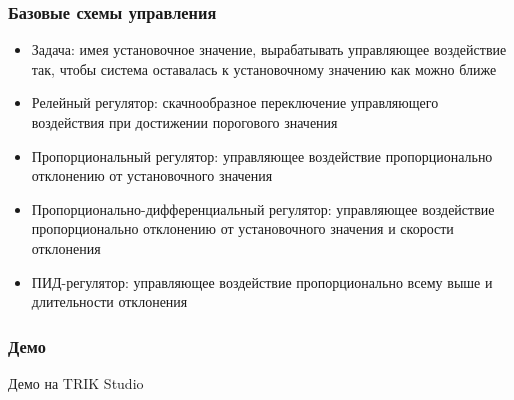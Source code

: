 \documentclass{../../slides-style}
\begin{document}
    \begin{frame}
        \frametitle{Базовые схемы управления}
        \begin{itemize}
            \item Задача: имея установочное значение, вырабатывать управляющее воздействие так, чтобы система оставалась к установочному значению как можно ближе
            \item Релейный регулятор: скачнообразное переключение управляющего воздействия при достижении порогового значения
            \item Пропорциональный регулятор: управляющее воздействие пропорционально отклонению от установочного значения
            \item Пропорционально-дифференциальный регулятор: управляющее воздействие пропорционально отклонению от установочного значения и скорости отклонения
            \item ПИД-регулятор: управляющее воздействие пропорционально всему выше и длительности отклонения
        \end{itemize}
    \end{frame}

    \begin{frame}
        \frametitle{Демо}
        \begin{center}
            \Huge{Демо на TRIK Studio}
        \end{center}
    \end{frame}
\end{document}
